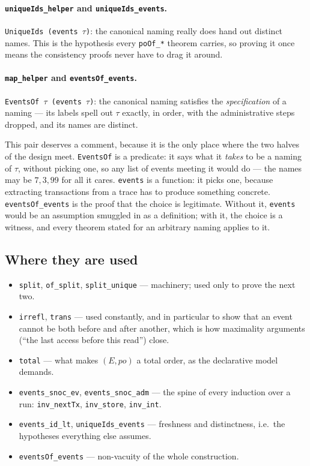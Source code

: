 \documentclass[11pt]{article}
\newcommand{\lean}[1]{\texttt{\small #1}}
\begin{document}
\paragraph{\lean{uniqueIds\_helper} and \lean{uniqueIds\_events}.}
\lean{UniqueIds (events $\tau$)}: the canonical naming really does hand out
distinct names. This is the hypothesis every \lean{poOf\_*} theorem carries, so
proving it once means the consistency proofs never have to drag it around.

\paragraph{\lean{map\_helper} and \lean{eventsOf\_events}.}
\lean{EventsOf $\tau$ (events $\tau$)}: the canonical naming satisfies the
\emph{specification} of a naming --- its labels spell out $\tau$ exactly, in
order, with the administrative steps dropped, and its names are distinct.

This pair deserves a comment, because it is the only place where the two halves
of the design meet. \lean{EventsOf} is a predicate: it says what it \emph{takes}
to be a naming of $\tau$, without picking one, so any list of events meeting it
would do --- the names may be $7, 3, 99$ for all it cares. \lean{events} is a
function: it picks one, because extracting transactions from a trace has to
produce something concrete. \lean{eventsOf\_events} is the proof that the choice
is legitimate. Without it, \lean{events} would be an assumption smuggled in as a
definition; with it, the choice is a witness, and every theorem stated for an
arbitrary naming applies to it.

\subsection{Where they are used}

\begin{itemize}
  \item \lean{split}, \lean{of\_split}, \lean{split\_unique} --- machinery; used
        only to prove the next two.
  \item \lean{irrefl}, \lean{trans} --- used constantly, and in particular to
        show that an event cannot be both before and after another, which is how
        maximality arguments (``the last access before this read'') close.
  \item \lean{total} --- what makes $(E, po)$ a total order, as the declarative
        model demands.
  \item \lean{events\_snoc\_ev}, \lean{events\_snoc\_adm} --- the spine of every
        induction over a run: \lean{inv\_nextTx}, \lean{inv\_store},
        \lean{inv\_int}.
  \item \lean{events\_id\_lt}, \lean{uniqueIds\_events} --- freshness and
        distinctness, i.e.\ the hypotheses everything else assumes.
  \item \lean{eventsOf\_events} --- non-vacuity of the whole construction.
\end{itemize}
\end{document}
